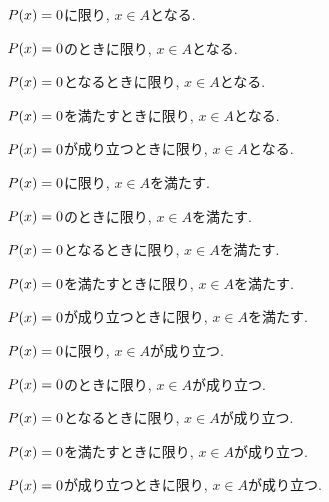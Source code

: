 \item $P(x)=0$に限り, $x\in A$となる.
\item $P(x)=0$のときに限り, $x\in A$となる.
\item $P(x)=0$となるときに限り, $x\in A$となる.
\item $P(x)=0$を満たすときに限り, $x\in A$となる.
\item $P(x)=0$が成り立つときに限り, $x\in A$となる.
\item $P(x)=0$に限り, $x\in A$を満たす.
\item $P(x)=0$のときに限り, $x\in A$を満たす.
\item $P(x)=0$となるときに限り, $x\in A$を満たす.
\item $P(x)=0$を満たすときに限り, $x\in A$を満たす.
\item $P(x)=0$が成り立つときに限り, $x\in A$を満たす.
\item $P(x)=0$に限り, $x\in A$が成り立つ.
\item $P(x)=0$のときに限り, $x\in A$が成り立つ.
\item $P(x)=0$となるときに限り, $x\in A$が成り立つ.
\item $P(x)=0$を満たすときに限り, $x\in A$が成り立つ.
\item $P(x)=0$が成り立つときに限り, $x\in A$が成り立つ.
